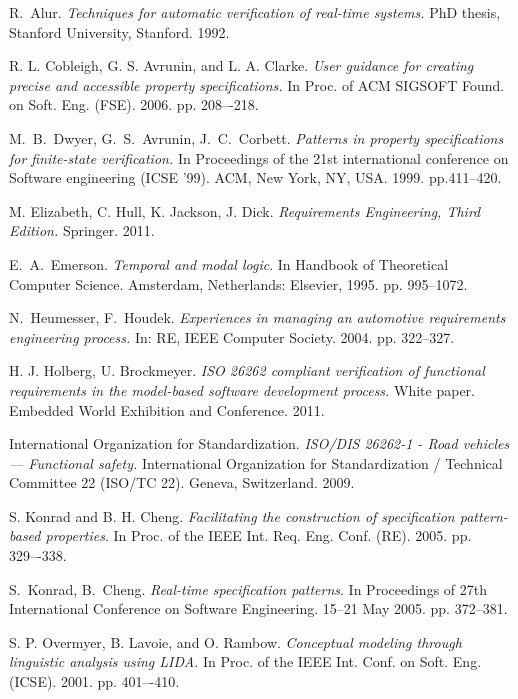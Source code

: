 \documentclass[conference]{IEEEtran}
\begin{document}
\begin{thebibliography}{1}

R.~Alur. \emph{Techniques for automatic verification of real-time systems.} PhD thesis, Stanford University, Stanford. 1992.

R. L. Cobleigh, G. S. Avrunin, and L. A. Clarke. \emph{User guidance for creating precise and accessible property specifications.} In Proc. of ACM SIGSOFT Found. on Soft. Eng. (FSE). 2006. pp. 208–-218.

M.~B.~Dwyer, G.~S.~Avrunin, J.~C.~Corbett. \emph{Patterns in property specifications for finite-state verification.} In Proceedings of the 21st international conference on Software engineering (ICSE '99). ACM, New York, NY, USA. 1999. pp.411--420. 

M. Elizabeth, C. Hull, K. Jackson, J. Dick. \emph{Requirements Engineering, Third Edition.} Springer. 2011.

E.~A.~Emerson. \emph{Temporal and modal logic}. In Handbook of Theoretical Computer Science. Amsterdam, Netherlands: Elsevier, 1995. pp. 995--1072.


N.~Heumesser, F.~Houdek. \emph{Experiences in managing an automotive requirements engineering process.} In: RE, IEEE Computer Society. 2004. pp. 322--327.

H. J. Holberg, U. Brockmeyer. \emph{ISO 26262 compliant verification of functional requirements in the model-based software development process.} White paper. Embedded World Exhibition and Conference. 2011.

International Organization for Standardization. \emph{ISO/DIS 26262-1 - Road vehicles — Functional safety.} International Organization for Standardization / Technical Committee 22 (ISO/TC 22). Geneva, Switzerland. 2009.

S. Konrad and B. H. Cheng. \emph{Facilitating the construction of specification pattern-based properties}. In Proc. of the IEEE Int. Req. Eng. Conf. (RE). 2005. pp. 329–-338.

S.~Konrad, B.~Cheng. \emph{Real-time specification patterns}. In Proceedings of 27th International Conference on Software Engineering. 15--21 May 2005. pp. 372--381.

S. P. Overmyer, B. Lavoie, and O. Rambow. \emph{Conceptual modeling through linguistic analysis using LIDA.} In Proc. of the IEEE Int. Conf. on Soft. Eng. (ICSE). 2001. pp. 401–-410.



\end{thebibliography}
\end{document}
